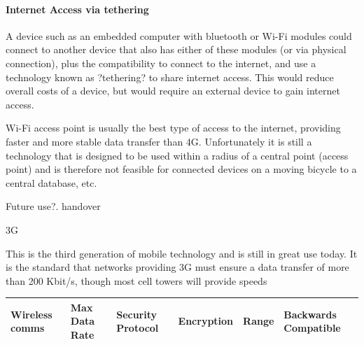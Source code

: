 \documentclass[a4paper]{report}
\begin{document}
{\paragraph{Internet Access via tethering} A device such as an embedded computer with bluetooth or Wi-Fi modules could connect to another device that also has either of these modules (or via physical connection), plus the compatibility to connect to the internet, and use a technology known as ?tethering? to share internet access. This would reduce overall costs of a device, but would require an external device to gain internet access.

Wi-Fi access point is usually the best type of access to the internet, providing faster and more stable data transfer than 4G. Unfortunately it is still a technology that is designed to be used within a radius of a central point (access point) and is therefore not feasible for connected devices on a moving bicycle to a central database, etc.  

Future use?.  handover

3G

This is the third generation of mobile technology and is still in great use today. It is the standard that networks providing 3G must ensure a data transfer of more than 200 Kbit/s, though most cell towers will provide speeds 

\begin{landscape}

\begin{table}[h]

   \center
    \begin{tabular}{ | m{3cm} | m{3cm} | m{3.5cm} | m{3cm} | m{3cm} | m{2.5cm} |}
    \hline
    \textbf{Wireless comms} & \textbf{Max Data Rate} & \textbf{Security Protocol} & \textbf{Encryption} & \textbf{Range} & \textbf{Backwards Compatible}\\ \hline
   

\end{tabular}
\end{table}
\end{landscape}}
\end{document}
